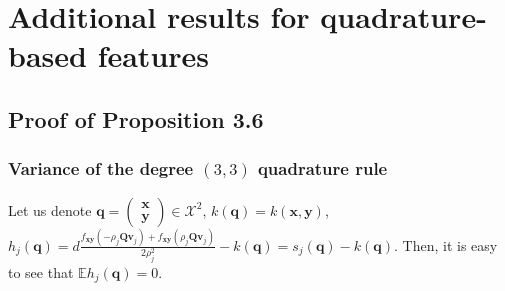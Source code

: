 \chapter{Additional results for quadrature-based features}

\section{Proof of Proposition 3.6}
\subsection{Variance of the degree $(3, 3)$ quadrature rule}
Let us denote $\mathbf{q} = \begin{pmatrix} \mathbf{x}\\ \mathbf{y} \end{pmatrix} \in \mathcal{X}^2$,
$k(\mathbf{q}) = k(\mathbf{x}, \mathbf{y})$,
$h_j(\mathbf{q}) = d \frac{f_{\mathbf{xy}}(-\rho_j \mathbf{Qv}_j) + f_{\mathbf{xy}}(\rho_j \mathbf{Qv}_j)}{2 \rho_j^2} - k(\mathbf{q}) =
s_j(\mathbf{q}) - k(\mathbf{q})$.
Then, it is easy to see that $\mathbb{E}h_j(\mathbf{q}) = 0$.

